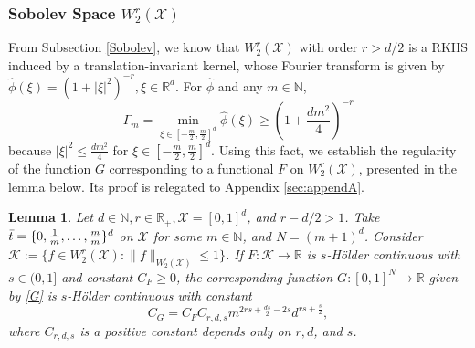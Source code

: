 \documentclass{article}
\def\NN{\mathbb N}
\def\RR{\mathbb R}
\numberwithin{equation}{section}
\newtheorem{lemma}[theorem]{Lemma}
\begin{document}
\subsubsection{Sobolev Space $W^r_2(\mathcal{X})$}
From Subsection \ref{Sobolev}, we know that $W^r_2(\mathcal{X})$ with order $r>d/2$ is a RKHS induced by a translation-invariant kernel, whose Fourier transform is given by 
    $\widehat \phi (\xi) = (1+|\xi|^2)^{-r}, \xi \in \RR^d$.
For $\widehat \phi$ and any $m\in \NN$, 
\begin{equation}\label{Gamma_m_Sob}
    \Gamma_m =  \min_{\xi \in [-\frac{m}{2},\frac{m}{2}]^d} \widehat{\phi}(\xi) \geq \left(1+ \frac{dm^2}{4}\right)^{-r}
\end{equation}
because $|\xi|^2 \leq \frac{dm^2}{4}$ for $ \xi \in [-\frac{m}{2},\frac{m}{2}]^d$. Using this fact, we establish the regularity of the function $G$ corresponding to a functional $F$ on $W^r_2(\mathcal{X})$, presented in the lemma below. Its proof is relegated to Appendix \ref{sec:appendA}. 
\begin{lemma}\label{lemma:C_G_Sob}
    Let $d\in \NN, r\in \RR_+,  \mathcal{X} = [0,1]^d$, and $r-d/2>1$. Take $\Bar{t}=\{ 0, \frac{1}{m},\ldots, \frac{m}{m}\}^d$ on $\mathcal{X}$ for some $m\in \NN$, and $N=(m+1)^d$. 
    Consider $
    \mathcal{K} := \{f\in W^r_2(\mathcal{X}): \|f\|_{W^r_2(\mathcal{X})} \leq 1\}
$. If $F: \mathcal{K} \to \RR$ is  $s$-H\"{o}lder continuous with $s \in (0,1]$ and constant $C_F\geq 0$, the corresponding function  
    $G:[0,1]^N \to \RR$  given by \eqref{G} is  $s$-H\"{o}lder continuous with constant
\begin{equation*}
    C_G =  C_F C_{r,d,s} m^{2rs+\frac{ds}{2}-2s} d^{rs+\frac{s}{2}}, 
\end{equation*}
where $C_{r,d,s}$ is a positive constant depends only on $r, d$, and $s$.
\end{lemma}
\end{document}
